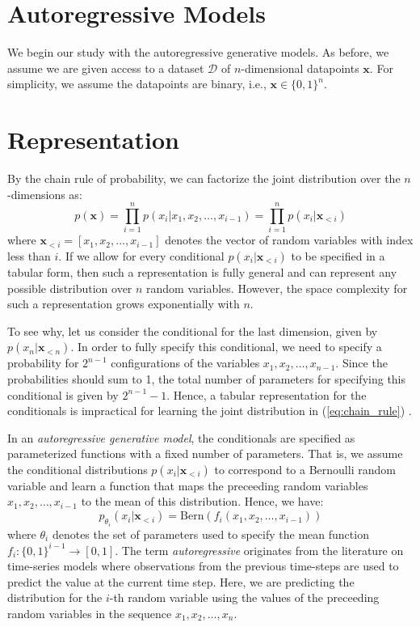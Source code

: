 \section{Autoregressive Models}

We begin our study with the autoregressive generative models. As before, we assume we are given access to a dataset $\mathcal{D}$  of $n$-dimensional datapoints $\mathbf{x}$. For simplicity, we assume the datapoints are binary, i.e.,  $\mathbf{x} \in \{0,1\}^n$.

\section{Representation}

By the chain rule of probability, we can factorize the joint distribution over the $n$-dimensions as:
\[
\begin{equation}
p(\mathbf{x}) = \prod\limits_{i=1}^{n}p(x_i \vert x_1, x_2, \ldots, x_{i-1}) = \prod\limits_{i=1}^{n} p(x_i \vert \mathbf{x}_{<i})
\end{equation}
\label{eq:chain_rule}
\]
where $\mathbf{x}_{<i}=[x_1, x_2, \ldots, x_{i-1}]$ denotes the vector of random variables with index less than $i$. If we allow for every conditional $p(x_i \vert \mathbf{x}_{<i})$ to be specified in a tabular form, then such a representation is fully general and can represent any possible distribution over $n$ random variables. However, the space complexity for such a representation grows exponentially with $n$. 

To see why, let us consider the conditional for the last dimension, given by $p(x_n \vert \mathbf{x}_{<n})$. In order to fully specify this conditional, we need to specify a probability for $2^{n-1}$ configurations of the variables $x_1, x_2, \ldots, x_{n-1}$.  Since the probabilities should sum to 1, the total number of parameters for specifying this conditional is given by $2^{n-1} -1$. Hence, a tabular representation for the conditionals is impractical for learning the joint distribution in (\ref{eq:chain_rule}) . 

In an \textit{autoregressive generative model}, the conditionals are specified as parameterized functions with a fixed number of parameters. That is, we assume the conditional distributions $p(x_i \vert \mathbf{x}_{<i})$ to correspond to a Bernoulli random variable and learn a function that maps the preceeding random variables $x_1, x_2, \ldots, x_{i-1}$ to the mean of this distribution. Hence, we have:
\[
p_{\theta_i}(x_i \vert \mathbf{x}_{<i}) = \mathrm{Bern}(f_i(x_1, x_2, \ldots, x_{i-1}))
\]
where $\theta_i$ denotes the set of parameters used to specify the mean function $f_i: \{0,1\}^{i-1}\rightarrow [0,1]$.  The term \textit{autoregressive} originates from the literature on time-series models where observations from the previous time-steps are used to predict the value at the current time step. Here, we are predicting the distribution for the $i$-th random variable using the values of the preceeding random variables in the sequence $x_1, x_2, \ldots, x_n$.

